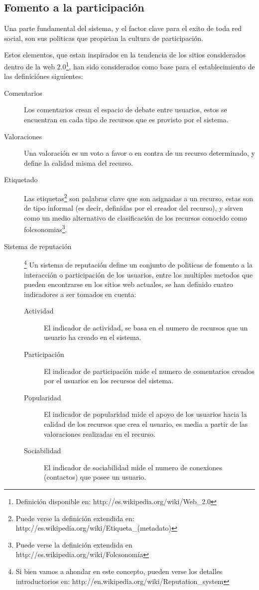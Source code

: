 \subsection{Fomento a la participación}

Una parte fundamental del sistema, y el factor clave para el exito de toda red
social, son sus politicas que propician la cultura de participación.

Estos elementos, que estan inspirados en la tendencia de los sitios considerados
dentro de la web 2.0\footnote{Definición disponible en:
http://es.wikipedia.org/wiki/Web\_2.0}, han sido considerados como base para el
establecimiento de las definiciónes siguientes:

\begin{description}
\item [Comentarios] Los comentarios crean el espacio de debate entre usuarios,
estos se encuentran en cada tipo de recursos que es provisto por el sistema.
\item [Valoraciones] Una valoración es un voto a favor o en contra de un recurso
determinado, y define la calidad misma del recurso.
\item [Etiquetado] Las etiquetas\footnote{Puede verse la definición extendida
en: http://es.wikipedia.org/wiki/Etiqueta\_(metadato)} son palabras clave que
son asignadas a un recurso, estas son de tipo informal (es decir, definidas por
el creador del recurso), y sirven como un medio alternativo de clasificación de
los recursos conocido como folcsonomias\footnote{Puede verse la definición
extendida en http://es.wikipedia.org/wiki/Folcsonomía}.
\item [Sistema de reputación]\footnote{Si bien vamos a ahondar en este concepto,
pueden verse los detalles introductorios en:
http://en.wikipedia.org/wiki/Reputation\_system} Un sistema de reputación
define un conjunto de politicas de fomento a la interacción o participación de
los usuarios, entre los multiples metodos que pueden encontrarse en los sitios
web actuales, se han definido cuatro indicadores a ser tomados en cuenta:
    \begin{description}
    \item [Actividad] El indicador de actividad, se basa en el numero de
    recursos que un usuario ha creado en el sistema.
    \item [Participación] El indicador de participación mide el numero de
    comentarios creados por el usuarios en los recursos del sistema.
    \item [Popularidad] El indicador de popularidad mide el apoyo de los
    usuarios hacia la calidad de los recursos que crea el usuario, es media a
    partir de las valoraciones realizadas en el recurso.
    \item [Sociabilidad] El indicador de sociabilidad mide el numero de
    conexiones (contactos) que posee un usuario.
    \end{description}
\end{description}

